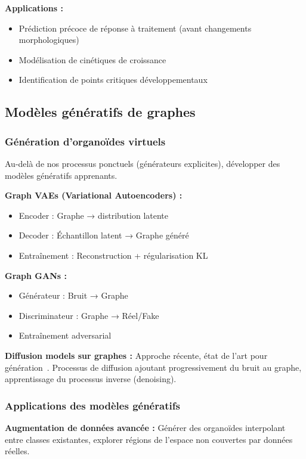 \textbf{Applications :}
\begin{itemize}
    \item Prédiction précoce de réponse à traitement (avant changements morphologiques)
    \item Modélisation de cinétiques de croissance
    \item Identification de points critiques développementaux
\end{itemize}

\subsection{Modèles génératifs de graphes}

\subsubsection{Génération d'organoïdes virtuels}

Au-delà de nos processus ponctuels (générateurs explicites), développer des modèles génératifs apprenants.

\textbf{Graph VAEs (Variational Autoencoders) :}
\begin{itemize}
    \item Encoder : Graphe → distribution latente
    \item Decoder : Échantillon latent → Graphe généré
    \item Entraînement : Reconstruction + régularisation KL
\end{itemize}

\textbf{Graph GANs :}
\begin{itemize}
    \item Générateur : Bruit → Graphe
    \item Discriminateur : Graphe → Réel/Fake
    \item Entraînement adversarial
\end{itemize}

\textbf{Diffusion models sur graphes :}
Approche récente, état de l'art pour génération~\cite{Sanchez2020}. Processus de diffusion ajoutant progressivement du bruit au graphe, apprentissage du processus inverse (denoising).

\subsubsection{Applications des modèles génératifs}

\textbf{Augmentation de données avancée :}
Générer des organoïdes interpolant entre classes existantes, explorer régions de l'espace non couvertes par données réelles.

